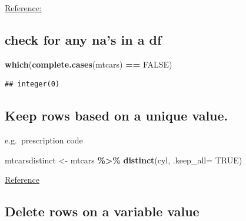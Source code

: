 \documentclass[
]{article}
\newenvironment{Shaded}{\begin{snugshade}}{\end{snugshade}}
\newcommand{\AttributeTok}[1]{\textcolor[rgb]{0.13,0.29,0.53}{#1}}
\newcommand{\ConstantTok}[1]{\textcolor[rgb]{0.56,0.35,0.01}{#1}}
\newcommand{\FunctionTok}[1]{\textcolor[rgb]{0.13,0.29,0.53}{\textbf{#1}}}
\newcommand{\NormalTok}[1]{#1}
\newcommand{\OtherTok}[1]{\textcolor[rgb]{0.56,0.35,0.01}{#1}}
\newcommand{\SpecialCharTok}[1]{\textcolor[rgb]{0.81,0.36,0.00}{\textbf{#1}}}
\begin{document}
\href{http://r-statistics.co/Missing-Value-Treatment-With-R.html}{Reference:}

\hypertarget{check-for-any-nas-in-a-df}{%
\subsection{check for any na's in a df}\label{check-for-any-nas-in-a-df}}

\begin{Shaded}
\begin{Highlighting}[]
\FunctionTok{which}\NormalTok{(}\FunctionTok{complete.cases}\NormalTok{(mtcars) }\SpecialCharTok{==} \ConstantTok{FALSE}\NormalTok{)}
\end{Highlighting}
\end{Shaded}

\begin{verbatim}
## integer(0)
\end{verbatim}

\hypertarget{keep-rows-based-on-a-unique-value.}{%
\subsection{Keep rows based on a unique value.}\label{keep-rows-based-on-a-unique-value.}}

e.g.~prescription code

\begin{Shaded}
\begin{Highlighting}[]
\NormalTok{mtcarsdistinct }\OtherTok{\textless{}{-}}\NormalTok{ mtcars }\SpecialCharTok{\%\textgreater{}\%}    \FunctionTok{distinct}\NormalTok{(cyl, }\AttributeTok{.keep\_all=} \ConstantTok{TRUE}\NormalTok{)}
\end{Highlighting}
\end{Shaded}

\href{http://www.datasciencemadesimple.com/remove-duplicate-rows-r-using-dplyr-distinct-function}{Reference}

\hypertarget{delete-rows-on-a-variable-value}{%
\subsection{Delete rows on a variable value}\label{delete-rows-on-a-variable-value}}
\end{document}
